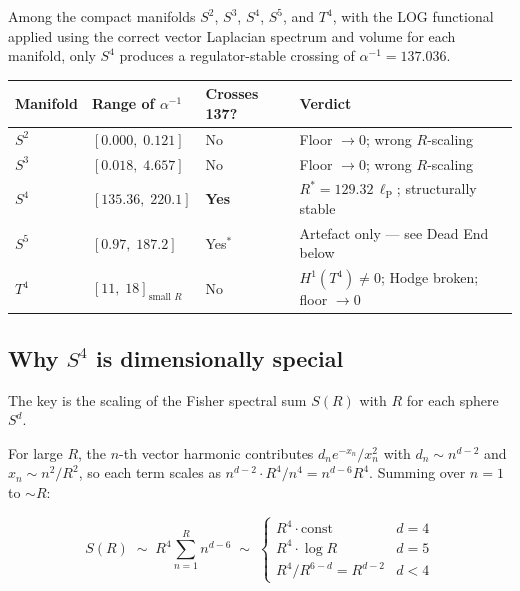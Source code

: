 \documentclass[12pt,a4paper]{article}
\newcommand{\lP}{\ell_{\mathrm{P}}}
\newcommand{\ai}{\alpha^{-1}}
\begin{document}
\begin{Tbox}
\label{thm:O3}
Among the compact manifolds $S^2$, $S^3$, $S^4$, $S^5$,
and $T^4$, with the LOG functional applied using the
correct vector Laplacian spectrum and volume
for each manifold, only $S^4$ produces a
regulator-stable crossing of $\alpha^{-1} = 137.036$.

\medskip
\begin{center}
\renewcommand{\arraystretch}{1.3}
\begin{tabular}{llll}
\toprule
Manifold & Range of $\ai$ & Crosses 137? & Verdict \\
\midrule
$S^2$ & $[0.000,\;0.121]$ & No &
  Floor $\to 0$; wrong $R$-scaling \\
$S^3$ & $[0.018,\;4.657]$ & No &
  Floor $\to 0$; wrong $R$-scaling \\
$S^4$ & $[135.36,\;220.1]$ & \textbf{Yes} &
  $R^*=129.32\,\lP$; structurally stable \\
$S^5$ & $[0.97,\;187.2]$ & Yes$^*$ &
  Artefact only --- see Dead End below \\
$T^4$ & $[11,\;18]_{\text{small }R}$ & No &
  $H^1(T^4)\neq 0$; Hodge broken; floor $\to 0$ \\
\bottomrule
\end{tabular}
\end{center}
\end{Tbox}

\subsection{Why $S^4$ is dimensionally special}

The key is the scaling of the Fisher spectral sum $S(R)$
with $R$ for each sphere $S^d$.

For large $R$, the $n$-th vector harmonic contributes
$d_n e^{-x_n}/x_n^2$ with $d_n \sim n^{d-2}$ and
$x_n \sim n^2/R^2$, so each term scales as
$n^{d-2} \cdot R^4/n^4 = n^{d-6} R^4$.
Summing over $n = 1$ to $\sim R$:

\begin{equation}
  S(R) \;\sim\; R^4 \sum_{n=1}^{R} n^{d-6}
  \;\sim\;
  \begin{cases}
    R^4 \cdot \text{const} & d = 4 \\
    R^4 \cdot \log R & d = 5 \\
    R^4 / R^{6-d} = R^{d-2} & d < 4
  \end{cases}
\end{equation}
\end{document}
